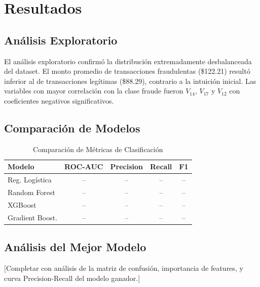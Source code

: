 \section{Resultados}

\subsection{Análisis Exploratorio}
El análisis exploratorio confirmó la distribución extremadamente desbalanceada
del dataset. El monto promedio de transacciones fraudulentas (\$122.21) resultó
inferior al de transacciones legítimas (\$88.29), contrario a la intuición
inicial. Las variables con mayor correlación con la clase fraude fueron
$V_{14}$, $V_{17}$ y $V_{12}$ con coeficientes negativos significativos.

\subsection{Comparación de Modelos}

\begin{table}[H]
\centering
\caption{Comparación de Métricas de Clasificación}
\label{tab:resultados}
\begin{tabular}{lcccc}
\toprule
\textbf{Modelo} & \textbf{ROC-AUC} & \textbf{Precision} & \textbf{Recall} & \textbf{F1} \\
\midrule
Reg. Logística   & --    & --    & --    & -- \\
Random Forest    & --    & --    & --    & -- \\
XGBoost          & --    & --    & --    & -- \\
Gradient Boost.  & --    & --    & --    & -- \\
\bottomrule
\end{tabular}
\end{table}

\subsection{Análisis del Mejor Modelo}
[Completar con análisis de la matriz de confusión, importancia de features,
y curva Precision-Recall del modelo ganador.]
